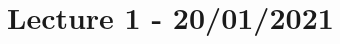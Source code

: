 \documentclass[12pt]{article}
\begin{document}
    \section*{Lecture 1 - 20/01/2021}
    
\end{document}
